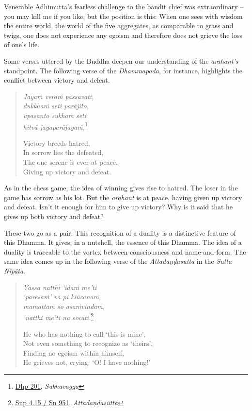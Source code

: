Venerable Adhimutta's fearless challenge to the bandit chief was extraordinary -- you may kill me if you like, but the position is this: When one sees with wisdom the entire world, the world of the five aggregates, as comparable to grass and twigs, one does not experience any egoism and therefore does not grieve the loss of one's life.

Some verses uttered by the Buddha deepen our understanding of the \emph{arahant's} standpoint. The following verse of the \emph{Dhammapada}, for instance, highlights the conflict between victory and defeat.

\begin{quote}
\emph{Jayaṁ veraṁ passavati,}\\
\emph{dukkhaṁ seti parājito,}\\
\emph{upasanto sukhaṁ seti}\\
\emph{hitvā jayaparājayaṁ.}\footnote{\href{https://suttacentral.net/dhp197-208/pli/ms}{Dhp 201}, \emph{Sukhavagga}}

Victory breeds hatred,\\
In sorrow lies the defeated,\\
The one serene is ever at peace,\\
Giving up victory and defeat.
\end{quote}

As in the chess game, the idea of winning gives rise to hatred. The loser in the game has sorrow as his lot. But the \emph{arahant} is at peace, having given up victory and defeat. Isn't it enough for him to give up victory? Why is it said that he gives up both victory and defeat?

These two go as a pair. This recognition of a duality is a distinctive feature of this Dhamma. It gives, in a nutshell, the essence of this Dhamma. The idea of a duality is traceable to the vortex between consciousness and name-and-form. The same idea comes up in the following verse of the \emph{Attadaṇḍasutta} in the \emph{Sutta Nipāta}.

\begin{quote}
\emph{Yassa natthi `idaṁ me'ti}\\
\emph{`paresaṁ' vā pi kiñcanaṁ,}\\
\emph{mamattaṁ so asaṁvindaṁ,}\\
\emph{`natthi me'ti na socati.}\footnote{\href{https://suttacentral.net/snp4.15/pli/ms}{Snp 4.15 / Sn 951}, \emph{Attadaṇḍasutta}}

He who has nothing to call `this is mine',\\
Not even something to recognize as `theirs',\\
Finding no egoism within himself,\\
He grieves not, crying: `O! I have nothing!'
\end{quote}

